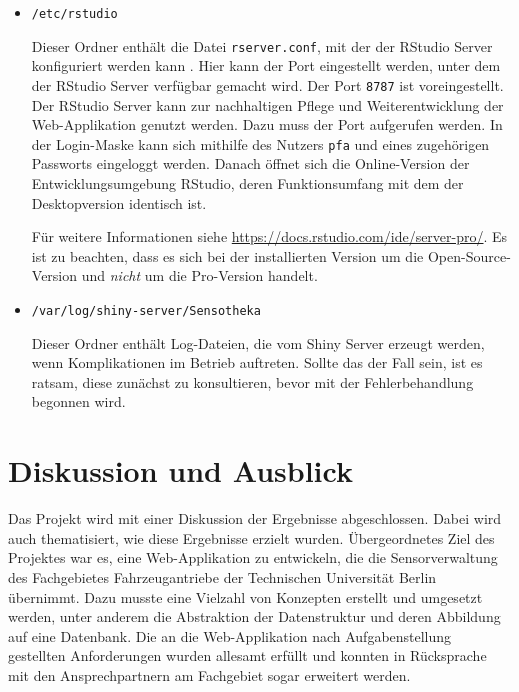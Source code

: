 \documentclass[
]{article}
\begin{document}
\begin{itemize}
\item
  \texttt{/etc/rstudio}

  Dieser Ordner enthält die Datei \texttt{rserver.conf}, mit der der RStudio Server konfiguriert werden kann \autocite{rstudio-server}. Hier kann der Port eingestellt werden, unter dem der RStudio Server verfügbar gemacht wird. Der Port \texttt{8787} ist voreingestellt. Der RStudio Server kann zur nachhaltigen Pflege und Weiterentwicklung der Web-Applikation genutzt werden. Dazu muss der Port aufgerufen werden. In der Login-Maske kann sich mithilfe des Nutzers \texttt{pfa} und eines zugehörigen Passworts eingeloggt werden. Danach öffnet sich die Online-Version der Entwicklungsumgebung RStudio, deren Funktionsumfang mit dem der Desktopversion identisch ist.

  Für weitere Informationen siehe \url{https://docs.rstudio.com/ide/server-pro/}. Es ist zu beachten, dass es sich bei der installierten Version um die Open-Source-Version und \emph{nicht} um die Pro-Version handelt.
\end{itemize}

\begin{itemize}
\item
  \texttt{/var/log/shiny-server/Sensotheka}

  Dieser Ordner enthält Log-Dateien, die vom Shiny Server erzeugt werden, wenn Komplikationen im Betrieb auftreten. Sollte das der Fall sein, ist es ratsam, diese zunächst zu konsultieren, bevor mit der Fehlerbehandlung begonnen wird.
\end{itemize}

\hypertarget{discussion}{%
\section{Diskussion und Ausblick}\label{discussion}}

Das Projekt wird mit einer Diskussion der Ergebnisse abgeschlossen. Dabei wird auch thematisiert, wie diese Ergebnisse erzielt wurden.
Übergeordnetes Ziel des Projektes war es, eine Web-Applikation zu entwickeln, die die Sensorverwaltung des Fachgebietes Fahrzeugantriebe der Technischen Universität Berlin übernimmt. Dazu musste eine Vielzahl von Konzepten erstellt und umgesetzt werden, unter anderem die Abstraktion der Datenstruktur und deren Abbildung auf eine Datenbank. Die an die Web-Applikation nach Aufgabenstellung gestellten Anforderungen wurden allesamt erfüllt und konnten in Rücksprache mit den Ansprechpartnern am Fachgebiet sogar erweitert werden.
\end{document}
